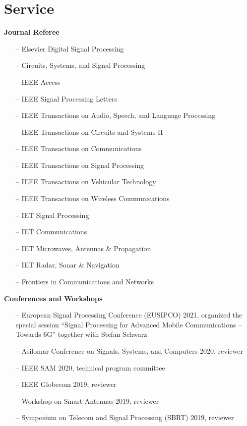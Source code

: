 \section{Service} 

{\bf Journal Referee}\\
\begin{itemize}
	\item[--] Elsevier Digital Signal Processing
	\item[--] Circuits, Systems, and Signal Processing
	\item[--] IEEE Access
	\item[--] IEEE Signal Processing Letters
	\item[--] IEEE Transactions on Audio, Speech, and Language Processing
	\item[--] IEEE Transactions on Circuits and Systems II
	\item[--] IEEE Transactions on Communications
	\item[--] IEEE Transactions on Signal Processing 
	\item[--] IEEE Transactions on Vehicular Technology
	\item[--] IEEE Transactions on Wireless Communications
	\item[--] IET Signal Processing
	\item[--] IET Communications
	\item[--] IET Microwaves, Antennas \& Propagation
	\item[--] IET Radar, Sonar \& Navigation
	\item[--] Frontiers in Communications and Networks 
\end{itemize}

{\bf Conferences and Workshops}\\
\begin{itemize}
	\item[--] European Signal Processing Conference (EUSIPCO) 2021, organized the special session ``Signal Processing for Advanced Mobile Communications – Towards 6G'' together with Stefan Schwarz
	\item[--] Asilomar Conference on Signals, Systems, and Computers 2020, reviewer
	\item[--] IEEE SAM 2020, technical program committee
	\item[--] IEEE Globecom 2019, reviewer
	\item[--] Workshop on Smart Antennas 2019, reviewer
	\item[--] Symposium on Telecom and Signal Processing (SBRT) 2019, reviewer
\end{itemize}